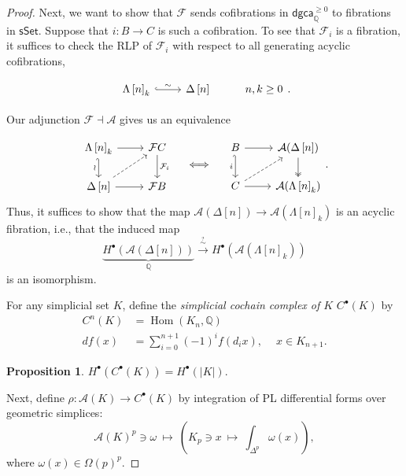 \documentclass[10pt,letterpaper,cm]{nupset}
\theoremstyle{definition}
\theoremstyle{theorem}
\newtheorem{prop}[defn]{Proposition}
\theoremstyle{remark}
\newcommand{\A}{\mathcal A}
\newcommand{\F}{\mathcal F}
\newcommand{\Q}{\mathbb Q}
\newcommand{\1}{\mathbb{1}}
\newcommand{\dgca}{\mathsf{dgca}}
\newcommand{\0}{\vec 0}
\DeclareMathOperator{\Hom}{Hom}
\begin{document}
\begin{proof}
\medskip

Next, we want to show that $\F$ sends cofibrations in $\dgca_{\Q}^{\geq 0}$ to fibrations in $\mathsf{sSet}$. Suppose that $i : B \to C$ is such a cofibration. To see that $\F_i$ is a fibration, it suffices to check the RLP of $\F_i$ with respect to all generating acyclic cofibrations,

\[
\begin{tikzcd}
	{\Lambda\left[n\right]_k } & {\Delta\left[n\right]} & {n,k \geq 0}
	\arrow["\sim", hook, from=1-1, to=1-2]
\end{tikzcd}
.\]

Our adjunction $\F \dashv \A$ gives us an equivalence

\[
\begin{tikzcd}
	{\Lambda\left[n\right]_k} & {\F{C}} \\
	{\Delta\left[n\right]} & {\F{B}}
	\arrow[from=2-1, to=2-2]
	\arrow["\wr"', hook', from=1-1, to=2-1]
	\arrow[from=1-1, to=1-2]
	\arrow["{\F_i}", from=1-2, to=2-2]
	\arrow[dashed, from=2-1, to=1-2]
\end{tikzcd}
\quad \iff \quad 
\begin{tikzcd}
	B & {\A(\Delta\left[n\right])} \\
	C & {\A(\Lambda\left[n\right]_k)}
	\arrow[from=2-1, to=2-2]
	\arrow["i"', hook', from=1-1, to=2-1]
	\arrow[from=1-1, to=1-2]
	\arrow[two heads, from=1-2, to=2-2]
	\arrow[dashed, from=2-1, to=1-2]
\end{tikzcd}.
\]
Thus, it suffices to show that the map $\A(\Delta\left[n\right]) \to \A(\Lambda\left[n\right]_k)$ is an acyclic fibration, i.e., that the induced map
\[
\underbrace{H^{\bullet}(\A(\Delta\left[n\right]))}_{\Q} \xrightarrow{\overset{?}{\sim}} H^{\bullet}(\A(\Lambda\left[n\right]_k))
\] is an isomorphism.

\medskip

For any simplicial set $K$, define the \textit{simplicial cochain complex of $K$} $C^{\bullet}(K)$ by
\begin{align*}
C^n(K) &  =\Hom(K_n, \Q)
\\ d{f}(x) & = \sum_{i=0}^{n+1} \left({-1}\right)^if(d_i{x}), \ \quad x \in K_{n+1}
.\end{align*}

\begin{prop}\label{isoreal}
$H^{\bullet}(C^{\bullet}(K)) = H^{\bullet}(\left\lvert{K}\right\rvert)$.
\end{prop}

Next, define $\rho : \A(K) \to C^{\bullet}(K)$ by integration of PL differential forms over geometric simplices:
\[
\A(K)^p \ni  \omega \  \mapsto  \ \left(K_p \ni x \ \mapsto \ \int_{\Delta^p}\omega(x)\right)
,\] where $\omega(x) \in \Omega(p)^p$.  


\end{proof}
\end{document}
